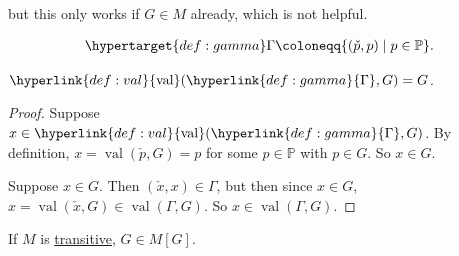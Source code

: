\documentclass{article}
\newcommand{\1}{\mathbbm{1}}
\DeclareMathOperator{\val}{val}
\begin{document}
but this only works if $G \in M$ already, which is not helpful.
\begin{defi}
  \begin{align*}
    \hypertarget{def:gamma}\Gamma \coloneqq \{(\check{p},p) \mid p \in \mathbb{P}\}.
  \end{align*}
\end{defi}
\begin{lemma}
  $\hyperlink{def:val}{\val}(\hyperlink{def:gamma}{\Gamma},G) = G$.
\end{lemma}
\begin{proof}
  Suppose $x \in \hyperlink{def:val}{\val}(\hyperlink{def:gamma}{\Gamma},G)$.
  By definition, $x = \val(\check{p},G)=p$ for some $p \in \mathbb{P}$ with $p \in G$.
  So $x \in G$.

  Suppose $x \in G$. Then $(\check{x},x) \in \Gamma$, but then since $x \in G$, $x = \val(\check{x},G) \in \val(\Gamma,G)$.
  So $x \in \val(\Gamma,G)$.
\end{proof}
\begin{cor}
  If $M$ is \hyperlink{def:transitive}{transitive}, $G \in M[G]$.
\end{cor}
\end{document}
